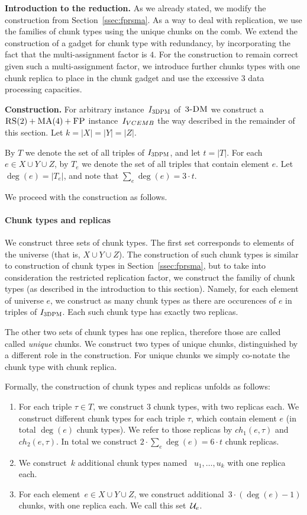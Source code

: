 \textbf{Introduction to the reduction.} As we already stated, we modify the construction from Section~\ref{ssec:fprsma}.
As a way to deal with replication, we use the families of chunk types using the unique chunks on the comb.
We extend the construction of a gadget for chunk type with redundancy, by incorporating the fact that the multi-assignment factor is $4$.
For the construction to remain correct given such a multi-assignment factor, we introduce further chunks types with one chunk replica to place in the chunk gadget and use the excessive $3$ data processing capacities.

\textbf{Construction.}
For arbitrary instance~$I_{\textsc{3DPM}}$ of~$\textsc{3-DM}$ we construct a~$\textsc{RS}(2)+\textsc{MA}(4)+\textsc{FP}$ instance~$I_{VCEMB}$ the way described in the remainder of this section.
Let $k = |X|=|Y|=|Z|$.

By $T$ we denote the set of all triples of $I_{\textsc{3DPM}}$, and let $t = |T|$.
For each $e\in X\cup Y\cup Z$, by $T_e$ we denote the set of all triples that contain element $e$.
Let $\deg(e) = |T_e|$, and note that $\sum_e \deg(e) = 3\cdot t$.

We proceed with the construction as follows.

\paragraph{Chunk types and replicas}

We construct three sets of chunk types.
The first set corresponds to elements of the universe (that is, $X\cup Y\cup Z$).
The construction of such chunk types is similar to construction of chunk types in Section~\ref{ssec:fprsma}, but to take into consideration the restricted replication factor, we construct the familiy of chunk types (as described in the introduction to this section).
Namely, for each element of universe $e$, we construct as many chunk types as there are occurences of $e$ in triples of $I_{\textsc{3DPM}}$.
Each such chunk type has exactly two replicas.

The other two sets of chunk types has one replica, therefore those are called called \emph{unique} chunks.
We construct two types of unique chunks, distinguished by a different role in the construction.
For unique chunks we simply co-notate the chunk type with chunk replica.

Formally, the construction of chunk types and replicas unfolds as follows:
\begin{enumerate}
  \item For each triple $\tau \in T$, we construct $3$ chunk types, with two replicas each.
  We construct different chunk types for each triple $\tau$, which contain element $e$ (in total $\deg(e)$ chunk types).
  We refer to those replicas by $ch_1(e, \tau)$ and $ch_2(e, \tau)$.
  In total we construct $2\cdot \sum_e\deg(e) = 6\cdot t$ chunk replicas.
  \item We construct~$k$ additional chunk types named
  ~$u_1, \ldots, u_k$ with one replica each.
  \item For each element~$e\in X\cup Y\cup Z$,
  we construct additional~$3\cdot(\deg(e) - 1)$ chunks, with one replica each.
  We call this set~${\mathcal{U}_e}$.
\end{enumerate}

